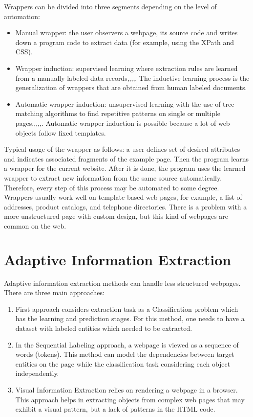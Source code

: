 \noindent Wrappers can be divided into three segments depending on the level of automation:
\begin{itemize}
    \item Manual wrapper: the user observers a webpage, its source code and writes down a program code to extract data (for example, using the XPath and CSS).
    \item Wrapper induction: supervised learning where extraction rules are learned from a manually labeled data records\cite{Hsu},\cite{BotUp},\cite{Stalker},\cite{Wien},\cite{Rapier}\cite{SRV}\cite{Vide}. The inductive learning process is the generalization of wrappers that are obtained from human labeled documents. 
    \item Automatic wrapper induction: unsupervised learning with the use of tree matching algorithms to find repetitive patterns on single or multiple pages\cite{Qiu},\cite{Dalvi},\cite{Diadem},\cite{Roadrunner},\cite{LiuMinData},\cite{Urest}. Automatic wrapper induction is possible because a lot of web objects follow fixed templates.
\end{itemize}

Typical usage of the wrapper as follows: a user defines set of desired attributes and indicates associated fragments of the example page. Then the program learns a wrapper for the current website. After it is done, the program uses the learned wrapper to extract new information from the same source automatically. Therefore, every step of this process may be automated to some degree. \\

Wrappers usually work well on template-based web pages, for example, a list of addresses, product catalogs, and telephone directories. There is a problem with a more unstructured page with custom design, but this kind of webpages are common on the web.

\section{Adaptive Information Extraction}

Adaptive information extraction methods can handle less structured webpages. There are three main approaches:

\begin{enumerate}
    \item First approach considers extraction task as a Classification problem which has the learning and prediction stages. For this method, one needs to have a dataset with labeled entities which needed to be extracted. 
    \item In the Sequential Labeling approach, a webpage is viewed as a sequence of words (tokens). This method can model the dependencies between target entities on the page while the classification task considering each object independently.
    \item Visual Information Extraction relies on rendering a webpage in a browser. This approach helps in extracting objects from complex web pages that may exhibit a visual pattern, but a lack of patterns in the HTML code.
\end{enumerate}

